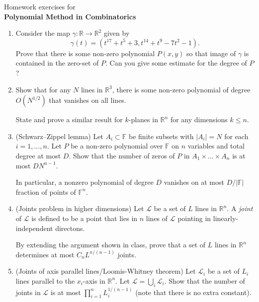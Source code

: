 \documentclass{article}
\newcommand{\FF}{\mathbb{F}}
\newcommand{\RR}{\mathbb{R}}
\begin{document}
\begin{center}
Homework exercises for \\
\textbf{Polynomial Method in Combinatorics}
\end{center}
	
\begin{enumerate}

\item

Consider the map $\gamma \colon \RR \to \RR^2$ given by
\[
\gamma(t) = (t^{17} + t^5 + 3, t^{14} +t^9 - 7t^2 -1).
\]
Prove that there is some non-zero polynomial $P(x, y)$ so that image of
$\gamma$ is contained in the zero-set of $P$. Can you give some estimate for the degree of $P$?

\item

Show that for any $N$ lines in $\RR^3$, there is some non-zero polynomial of degree $O(N^{1/2})$ that vanishes on all lines.

State and prove a similar result for $k$-planes in $\RR^n$ for any dimensions $k \le n$.


\item

(Schwarz--Zippel lemma) Let $A_i \subset \FF$ be finite subsets with $|A_i| = N$ for each $i = 1, \dots, n$. Let $P$ be a non-zero polynomial over $\FF$ on $n$ variables and total degree at most $D$. Show that the number of zeros of $P$ in $A_1 \times \dots \times A_n$ is at most $DN^{n-1}$.

In particular, a nonzero polynomial of degree $D$ vanishes on at most $D/|\FF|$ fraction of points of $\FF^n$.


\item

(Joints problem in higher dimensions) Let $\mathcal{L}$ be a set of $L$ lines in $\RR^n$. A \emph{joint} of $\mathcal{L}$ is defined to be a point that lies in $n$ lines of $\mathcal{L}$ pointing in linearly-independent directons.

By extending the argument shown in class, prove that a set of $L$ lines in $\RR^n$ determines at most $C_n L^{n/(n-1)}$ joints.

\item

(Joints of axis parallel lines/Loomis-Whitney theorem) Let $\mathcal{L}_i$ be a set of $L_i$ lines parallel to the $x_i$-axis in $\RR^n$. Let $\mathcal{L} = \bigcup_i \mathcal{L}_i$. Show that the number of joints in $\mathcal{L}$ is at most $\prod_{i=1}^n L_i^{1/(n-1)}$ (note that there is no extra constant).



\end{enumerate}
\end{document}
